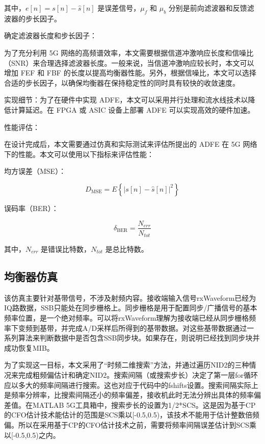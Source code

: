 \documentclass[UTF8,a4paper,12pt]{ctexart}
\numberwithin{equation}{section}
\begin{document}
其中，$e[n] = s[n] - \hat{s}[n]$ 是误差信号，$\mu_f$ 和 $\mu_b$ 分别是前向滤波器和反馈滤波器的步长因子。

确定滤波器长度和步长因子：

为了充分利用 5G 网络的高频谱效率，本文需要根据信道冲激响应长度和信噪比（SNR）来合理选择滤波器长度。一般来说，当信道冲激响应较长时，本文可以增加 FEF 和 FBF 的长度以提高均衡器性能。另外，根据信噪比，本文可以选择合适的步长因子，以确保均衡器在保持稳定性的同时具有较快的收敛速度。

实现细节：为了在硬件中实现 ADFE，本文可以采用并行处理和流水线技术以降低计算延迟。在 FPGA 或 ASIC 设备上部署 ADFE 可以实现高效的硬件加速。

性能评估：

在设计完成后，本文需要通过仿真和实际测试来评估所提出的 ADFE 在 5G 网络下的性能。本文可以使用以下指标来评估性能：

均方误差（MSE）：

\begin{equation}
	D_\text{MSE} = E\left\{ |s[n] - \hat{s}[n]|^2 \right\}
\end{equation}

误码率（BER）：

\begin{equation}
	\delta_\text{BER} = \frac{N_{err}}{N_{tot}}
\end{equation}

其中，$N_{err}$ 是错误比特数，$N_{tot}$ 是总比特数。

\subsection{均衡器仿真}
该仿真主要针对基带信号，不涉及射频内容。接收端输入信号rxWaveform已经为IQ路数据，SSB只能处在同步栅格上。同步栅格是用于配置同步/广播信号的基本频率位置，是一个绝对频率。可以将rxWaveform理解为接收端已经从同步栅格频率下变频到基带，并完成A/D采样后所得到的基带数据。对这些基带数据通过一系列算法来判断数据中是否包含SSB同步块。如果存在，则说明已经找到同步块并成功恢复MIB。

为了实现这一目标，本文采用了“时频二维搜索”方法，并通过遍历NID2的三种情况来完成粗频偏估计和确定NID2。搜索间隔（或搜索步长）决定了第一层for循环应以多大的频率间隔进行搜索。这也对应于代码中的fshifts设置。搜索间隔实际上是频率分辨率，比搜索间隔还小的频率偏差，接收机此时无法分辨出具体的频率偏差值。在MATLAB 5G工具箱中，搜索步长的设置为1/2*SCS。这是因为基于CP的CFO估计技术能估计的范围是SCS乘以[-0.5,0.5)，该技术不能用于估计整数倍频偏。所以在采用基于CP的CFO估计技术之前，需要将频率间隔误差估计到SCS乘以[-0.5,0.5)之内。
\end{document}
